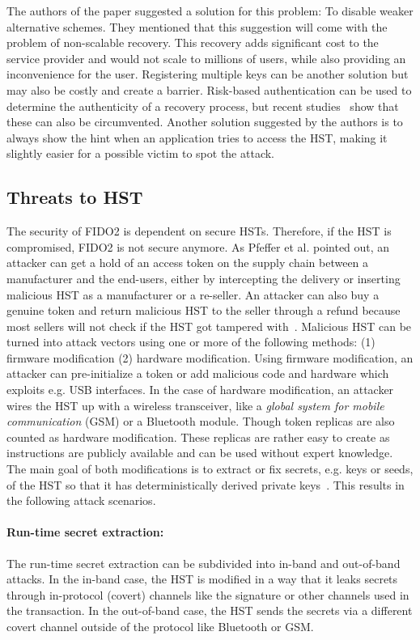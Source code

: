 \documentclass[runningheads]{llncs}
\begin{document}
The authors of the paper suggested a solution for this problem: To disable weaker alternative schemes. They mentioned that this suggestion will come with the problem of non-scalable recovery. This recovery adds significant cost to the service provider and would not scale to millions of users, while also providing an inconvenience for the user. Registering multiple keys can be another solution but may also be costly and create a barrier. Risk-based authentication can be used to determine the authenticity of a recovery process, but recent studies~\cite{10.1145/3372297.3417892} show that these can also be circumvented. Another solution suggested by the authors is to always show the hint when an application tries to access the HST, making it slightly easier for a possible victim to spot the attack.

\subsection{Threats to HST}
The security of FIDO2 is dependent on secure HSTs. Therefore, if the HST is compromised, FIDO2 is not secure anymore. As Pfeffer et al. pointed out, an attacker can get a hold of an access token on the supply chain between a manufacturer and the end-users, either by intercepting the delivery or inserting malicious HST as a manufacturer or a re-seller. An attacker can also buy a genuine token and return malicious HST to the seller through a refund because most sellers will not check if the HST got tampered with~\cite{000007}. Malicious HST can be turned into attack vectors using one or more of the following methods: (1) firmware modification (2) hardware modification. Using firmware modification, an attacker can pre-initialize a token or add malicious code and hardware which exploits e.g. USB interfaces. In the case of hardware modification, an attacker wires the HST up with a wireless transceiver, like a \textit{global system for mobile communication} (GSM) or a Bluetooth module. Though token replicas are also counted as hardware modification. These replicas are rather easy to create as instructions are publicly available and can be used without expert knowledge. The main goal of both modifications is to extract or fix secrets, e.g. keys or seeds, of the HST so that it has deterministically derived private keys~\cite{272198}. This results in the following attack scenarios.

\paragraph{Run-time secret extraction:}
The run-time secret extraction can be subdivided into in-band and out-of-band attacks. In the in-band case, the HST is modified in a way that it leaks secrets through in-protocol (covert) channels like the signature or other channels used in the transaction. In the out-of-band case, the HST sends the secrets via a different covert channel outside of the protocol like Bluetooth or GSM.
\end{document}

